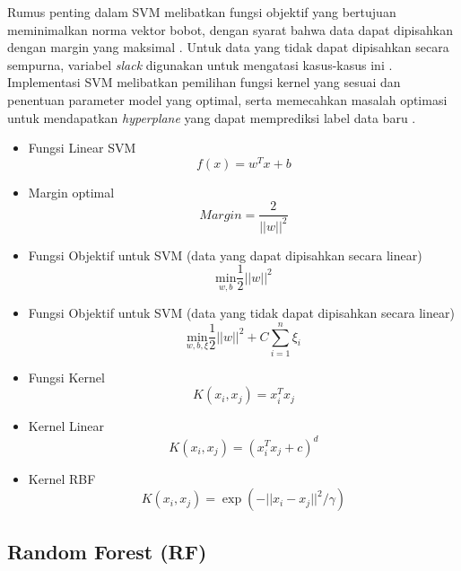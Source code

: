 \documentclass[conference]{IEEEtran}
\begin{document}
Rumus penting dalam SVM melibatkan fungsi objektif yang bertujuan meminimalkan norma vektor bobot, dengan syarat bahwa data dapat dipisahkan dengan margin yang maksimal \cite{b21}. Untuk data yang tidak 
dapat dipisahkan secara sempurna, variabel \textit{slack} digunakan untuk mengatasi kasus-kasus ini \cite{b22}. Implementasi SVM melibatkan pemilihan fungsi kernel yang sesuai dan penentuan parameter 
model yang optimal, serta memecahkan masalah optimasi untuk mendapatkan \textit{hyperplane} yang dapat memprediksi label data baru \cite{b20}.

\begin{itemize}
    \item Fungsi Linear SVM
        \begin{equation}
            f(x) = w^T x + b
        \end{equation}
    \item Margin optimal
        \begin{equation}
            Margin = \frac{2}{||w||^2}
        \end{equation}
    \item Fungsi Objektif untuk SVM (data yang dapat dipisahkan secara linear)
        \begin{equation}
            \underset{w,b}{\text{min}} \frac{1}{2} ||w||^2
        \end{equation}
    \item Fungsi Objektif untuk SVM (data yang tidak dapat dipisahkan secara linear)
        \begin{equation}
            \underset{w,b,\xi}{\text{min}} \frac{1}{2} ||w||^2 + C \sum_{i=1}^n \xi_i
        \end{equation}
    \item Fungsi Kernel
        \begin{equation}
            K(x_i, x_j) = x_i^T x_j
        \end{equation}
    \item Kernel Linear
        \begin{equation}
            K(x_i, x_j) = (x_i^T x_j + c)^d
        \end{equation}
    \item Kernel RBF
        \begin{equation}
            K(x_i, x_j) = \exp(-||x_i - x_j||^2 / \gamma)
        \end{equation}
\end{itemize}

\subsection{Random Forest (RF)}
\end{document}
